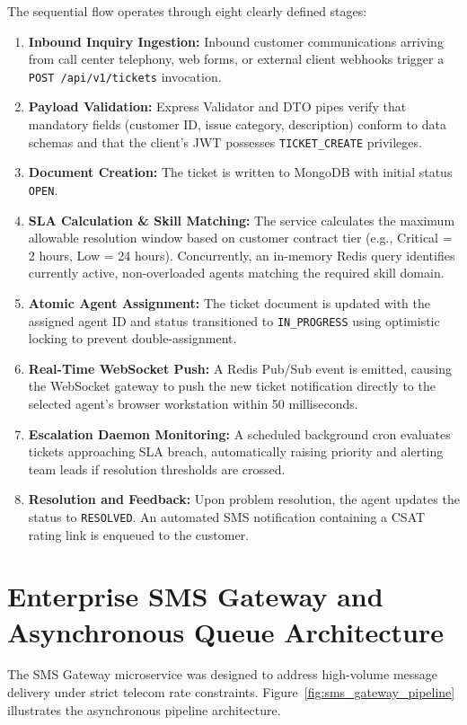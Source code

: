 The sequential flow operates through eight clearly defined stages:
\begin{enumerate}
    \item \textbf{Inbound Inquiry Ingestion:} Inbound customer communications arriving from call center telephony, web forms, or external client webhooks trigger a \texttt{POST /api/v1/tickets} invocation.
    \item \textbf{Payload Validation:} Express Validator and DTO pipes verify that mandatory fields (customer ID, issue category, description) conform to data schemas and that the client's JWT possesses \texttt{TICKET\_CREATE} privileges.
    \item \textbf{Document Creation:} The ticket is written to MongoDB with initial status \texttt{OPEN}.
    \item \textbf{SLA Calculation \& Skill Matching:} The service calculates the maximum allowable resolution window based on customer contract tier (e.g., Critical = 2 hours, Low = 24 hours). Concurrently, an in-memory Redis query identifies currently active, non-overloaded agents matching the required skill domain.
    \item \textbf{Atomic Agent Assignment:} The ticket document is updated with the assigned agent ID and status transitioned to \texttt{IN\_PROGRESS} using optimistic locking to prevent double-assignment.
    \item \textbf{Real-Time WebSocket Push:} A Redis Pub/Sub event is emitted, causing the WebSocket gateway to push the new ticket notification directly to the selected agent's browser workstation within 50 milliseconds.
    \item \textbf{Escalation Daemon Monitoring:} A scheduled background cron evaluates tickets approaching SLA breach, automatically raising priority and alerting team leads if resolution thresholds are crossed.
    \item \textbf{Resolution and Feedback:} Upon problem resolution, the agent updates the status to \texttt{RESOLVED}. An automated SMS notification containing a CSAT rating link is enqueued to the customer.
\end{enumerate}

\section{Enterprise SMS Gateway and Asynchronous Queue Architecture}
\label{sec:arch_sms_pipeline}

The SMS Gateway microservice was designed to address high-volume message delivery under strict telecom rate constraints. Figure~\ref{fig:sms_gateway_pipeline} illustrates the asynchronous pipeline architecture.

